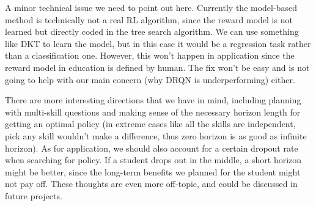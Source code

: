 A minor technical issue we need to point out here. Currently the model-based method is technically not a real RL algorithm, since the reward model is not learned but directly coded in the tree search algorithm. We can use something like DKT to learn the model, but in this case it would be a regression task rather than a classification one. However, this won't happen in application since the reward model in education is defined by human. The fix won't be easy and is not going to help with our main concern (why DRQN is underperforming) either.

There are more interesting directions that we have in mind, including planning with multi-skill questions and making sense of the necessary horizon length for getting an optimal policy (in extreme cases like all the skills are independent, pick any skill wouldn't make a difference, thus zero horizon is as good as infinite horizon). As for application, we should also account for a certain dropout rate when searching for policy. If a student drops out in the middle, a short horizon might be better, since the long-term benefits we planned for the student might not pay off. These thoughts are even more off-topic, and could be discussed in future projects.